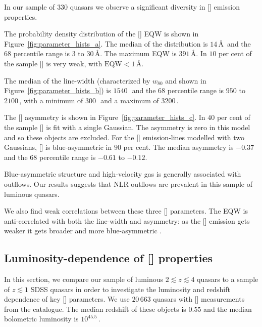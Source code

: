 In our sample of $330$ quasars we observe a significant diversity in [] emission properties. 

The probability density distribution of the [] EQW is shown in Figure~\ref{fig:parameter_hists_a}. 
The median of the distribution is $14$\,\AA\, and the $68$ percentile range is $3$ to $30$\,\AA.
The maximum EQW is $391$\,\AA.  
In $10$ per cent of the sample [] is very weak, with $\text{EQW} < 1$\,\AA.  

The median of the line-width (characterized by $w_{80}$ and shown in Figure~\ref{fig:parameter_hists_b}) is $1540$\,\kms\, and the $68$ percentile range is $950$ to $2100$\,\kms, with a minimum of $300$\,\kms\, and a maximum of $3200$\,\kms.

The [] asymmetry is shown in Figure~\ref{fig:parameter_hists_c}. 
In $40$ per cent of the sample [] is fit with a single Gaussian. 
The asymmetry is zero in this model and so these objects are excluded. 
For the [] emission-lines modelled with two Gaussians, [] is blue-asymmetric in $90$ per cent.
The median asymmetry is $-0.37$ and the $68$ percentile range is $-0.61$ to $-0.12$.

Blue-asymmetric structure and high-velocity gas is generally associated with outflows. 
Our results suggests that NLR outflows are prevalent in this sample of luminous quasars. 

We also find weak correlations between these three [] parameters. 
The EQW is anti-correlated with both the line-width and asymmetry: as the [] emission gets weaker it gets broader and more blue-asymmetric \citep[e.g.][]{shen14}.  

\subsection{Luminosity-dependence of [] properties}
\label{sec:ch4-lumdependence}

In this section, we compare our sample of luminous $2 \lesssim z \lesssim 4$ quasars to a sample of $z\lesssim1$ SDSS quasars in order to investigate the luminosity and redshift dependence of key [] parameters. 
We use $20\,663$ quasars with [] measurements from the \citet{shen11} catalogue. 
The median redshift of these objects is $0.55$ and the median bolometric luminosity is $10^{45.5}$\,\ergs.

